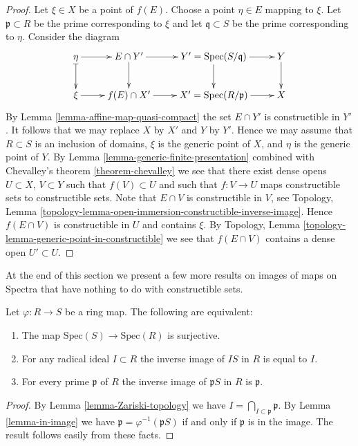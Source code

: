 \begin{proof}
Let $\xi \in X$ be a point of $f(E)$. Choose a point $\eta \in E$
mapping to $\xi$. Let $\mathfrak p \subset R$ be the prime
corresponding to $\xi$ and let $\mathfrak q \subset S$ be the
prime corresponding to $\eta$. Consider the diagram
$$
\xymatrix{
\eta \ar[r] \ar@{|->}[d] & E \cap Y' \ar[r] \ar[d] &
Y' = \text{Spec}(S/\mathfrak q) \ar[r] \ar[d] &
Y \ar[d] \cr
\xi \ar[r] & f(E) \cap X' \ar[r] &
X' = \text{Spec}(R/\mathfrak p) \ar[r] &
X
}
$$
By Lemma \ref{lemma-affine-map-quasi-compact} the set $E \cap Y'$
is constructible in $Y'$.
It follows that we may replace $X$ by $X'$ and
$Y$ by $Y'$. Hence we may assume that $R \subset S$ is an
inclusion of domains, $\xi$ is the generic
point of $X$, and $\eta$ is the generic point of $Y$.
By Lemma \ref{lemma-generic-finite-presentation}
combined with Chevalley's theorem \ref{theorem-chevalley}
we see that there exist dense opens $U \subset X$,
$V \subset Y$ such that $f(V) \subset U$ and
such that $f : V \to U$ maps constructible sets
to constructible sets. Note that $E \cap V$ is
constructible in $V$, see Topology,
Lemma \ref{topology-lemma-open-immersion-constructible-inverse-image}.
Hence $f(E \cap V)$ is constructible in $U$ and contains $\xi$.
By Topology, Lemma \ref{topology-lemma-generic-point-in-constructible}
we see that $f(E \cap V)$ contains a dense open $U' \subset U$.
\end{proof}

\noindent
At the end of this section we present a few more results on
images of maps on Spectra that have nothing to do with constructible
sets.

\begin{lemma}
\label{lemma-surjective-spec-radical-ideal}
Let $\varphi : R \to S$ be a ring map.
The following are equivalent:
\begin{enumerate}
\item The map $\text{Spec}(S) \to \text{Spec}(R)$ is surjective.
\item For any radical ideal $I \subset R$
the inverse image of $IS$ in $R$ is equal to $I$.
\item For every prime $\mathfrak p$ of $R$ the inverse
image of $\mathfrak p S$ in $R$ is $\mathfrak p$.
\end{enumerate}
\end{lemma}

\begin{proof}
By Lemma \ref{lemma-Zariski-topology} we have
$I = \bigcap_{I \subset \mathfrak p} \mathfrak p$.
By Lemma \ref{lemma-in-image} we have $\mathfrak p
= \varphi^{-1}(\mathfrak p S)$ if and only if
$\mathfrak p$ is in the image.
The result follows easily from these facts.
\end{proof}

